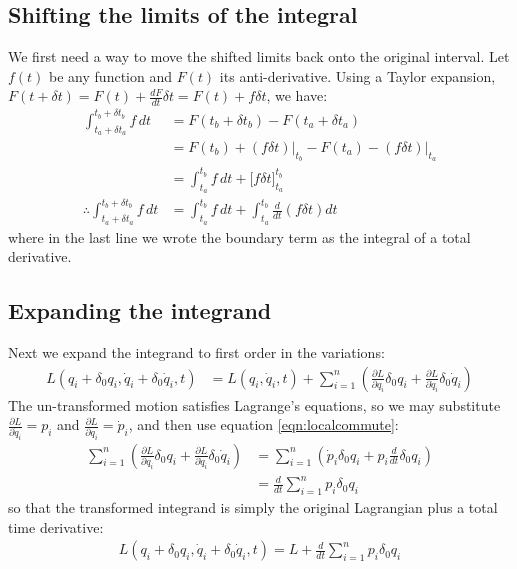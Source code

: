 \subsection{Shifting the limits of the integral}
We first need a way to move the shifted limits back onto the original interval. Let $f(t)$ be any function and $F(t)$ its anti-derivative. Using a Taylor expansion, $F(t+\delta t)=F(t)+\frac{dF}{dt}\delta t=F(t)+f\delta t$, we have:
\begin{align}
\int_{t_a+\delta t_a}^{t_b+\delta t_b} f\,dt &= F(t_b+\delta t_b)-F(t_a+\delta t_a)\nonumber\\
&=F(t_b)+\left(f\delta t\right)\Big\rvert_{t_b}-F(t_a)-\left(f\delta t\right)\Big\rvert_{t_a}\nonumber\\
&=\int_{t_a}^{t_b}f\,dt+\Big[f\delta t\Big]_{t_a}^{t_b}\nonumber\\
\therefore \int_{t_a+\delta t_a}^{t_b+\delta t_b} f\,dt&=\int_{t_a}^{t_b}f\,dt+\int_{t_a}^{t_b}\frac{d}{dt}\left(f\delta t\right)dt
\label{eqn:shiftlimits}
\end{align}
where in the last line we wrote the boundary term as the integral of a total derivative.

\subsection{Expanding the integrand}
Next we expand the integrand to first order in the variations:
\begin{align}
L(q_i+\delta_0 q_i,\dot{q}_i+\delta_0\dot{q}_i,t)&=L(q_i,\dot{q}_i,t)+\sum_{i=1}^n\left(\frac{\partial L}{\partial q_i}\delta_0 q_i+\frac{\partial L}{\partial \dot{q}_i}\delta_0\dot{q}_i\right)
\end{align}
The un-transformed motion satisfies Lagrange's equations, so we may substitute $\frac{\partial L}{\partial \dot{q}_i}=p_i$ and $\frac{\partial L}{\partial q_i}=\dot{p}_i$, and then use equation \ref{eqn:localcommute}:
\begin{align}
\sum_{i=1}^n\left(\frac{\partial L}{\partial q_i}\delta_0 q_i+\frac{\partial L}{\partial \dot{q}_i}\delta_0\dot{q}_i\right)&=\sum_{i=1}^n\left(\dot{p}_i\delta_0 q_i+p_i\frac{d}{dt}\delta_0 q_i\right)\nonumber\\
&=\frac{d}{dt}\sum_{i=1}^n p_i\delta_0 q_i
\end{align}
so that the transformed integrand is simply the original Lagrangian plus a total time derivative:
\begin{align}
L(q_i+\delta_0 q_i,\dot{q}_i+\delta_0\dot{q}_i,t)=L+\frac{d}{dt}\sum_{i=1}^n p_i\delta_0 q_i
\label{eqn:transformedL}
\end{align}

